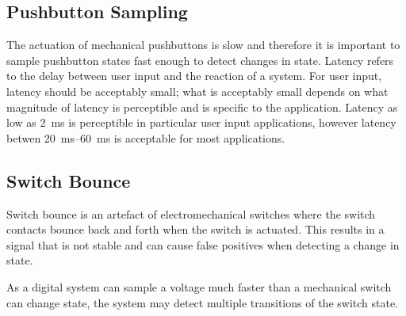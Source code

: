\documentclass[a4paper]{report}
\begin{document}
\subsection{Pushbutton Sampling}
The actuation of mechanical pushbuttons is slow and therefore it is important to sample pushbutton states fast enough to detect changes in state.
Latency refers to the delay between user input and the reaction of a system. For user input, latency should be acceptably small;
what is acceptably small depends on what magnitude of latency is perceptible and is specific to the application.
Latency as low as \qty{2}{ms} is perceptible in particular user input applications, however latency betwen \qtyrange{20}{60}{ms} is acceptable for most applications.
\subsection{Switch Bounce}
Switch bounce is an artefact of electromechanical switches where the switch contacts bounce back and forth when the switch is actuated.
This results in a signal that is not stable and can cause false positives when detecting a change in state.

As a digital system can sample a voltage much faster than a mechanical switch can change state, the system may detect multiple
transitions of the switch state.
\end{document}
